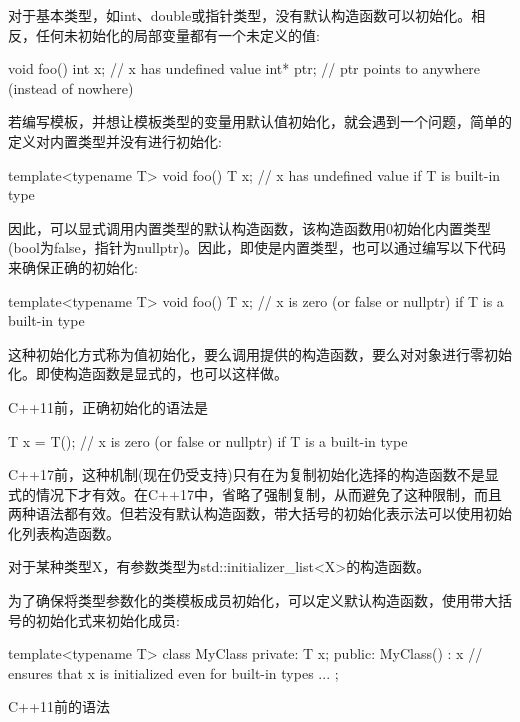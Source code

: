 对于基本类型，如int、double或指针类型，没有默认构造函数可以初始化。相反，任何未初始化的局部变量都有一个未定义的值:

\begin{cpp}
void foo()
{
	int x; // x has undefined value
	int* ptr; // ptr points to anywhere (instead of nowhere)
}
\end{cpp}

若编写模板，并想让模板类型的变量用默认值初始化，就会遇到一个问题，简单的定义对内置类型并没有进行初始化:

\begin{cpp}
template<typename T>
void foo()
{
	T x; // x has undefined value if T is built-in type
}
\end{cpp}

因此，可以显式调用内置类型的默认构造函数，该构造函数用0初始化内置类型(bool为false，指针为nullptr)。因此，即使是内置类型，也可以通过编写以下代码来确保正确的初始化:

\begin{cpp}
template<typename T>
void foo()
{
	T x{}; // x is zero (or false or nullptr) if T is a built-in type
}
\end{cpp}

这种初始化方式称为值初始化，要么调用提供的构造函数，要么对对象进行零初始化。即使构造函数是显式的，也可以这样做。

C++11前，正确初始化的语法是

\begin{cpp}
T x = T(); // x is zero (or false or nullptr) if T is a built-in type
\end{cpp}

C++17前，这种机制(现在仍受支持)只有在为复制初始化选择的构造函数不是显式的情况下才有效。在C++17中，省略了强制复制，从而避免了这种限制，而且两种语法都有效。但若没有默认构造函数，带大括号的初始化表示法可以使用初始化列表构造函数。

\begin{notice}对于某种类型X，有参数类型为std::initializer\_list<X>的构造函数。
\end{notice}

为了确保将类型参数化的类模板成员初始化，可以定义默认构造函数，使用带大括号的初始化式来初始化成员:

\begin{cpp}
template<typename T>
class MyClass {
private:
	T x;
public:
	MyClass() : x{} { // ensures that x is initialized even for built-in types
	}
	...
};
\end{cpp}

C++11前的语法

